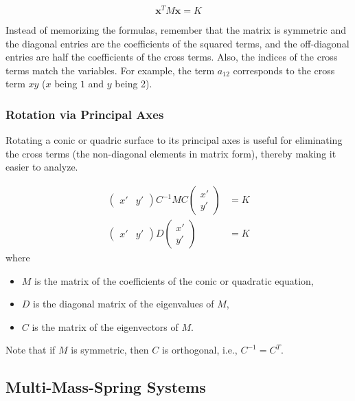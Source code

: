 \begin{equation*}
    \mathbf{x}^T M \mathbf{x} = K
\end{equation*}

Instead of memorizing the formulas, remember that the matrix is symmetric and the diagonal entries are the coefficients of the squared terms, and the off-diagonal entries are half the coefficients of the cross terms. Also, the indices of the cross terms match the variables. For example, the term $a_{12}$ corresponds to the cross term $xy$ ($x$ being $1$ and $y$ being 2).

\subsubsection{Rotation via Principal Axes}

Rotating a conic or quadric surface to its principal axes is useful for eliminating the cross terms (the non-diagonal elements in matrix form), thereby making it easier to analyze.

\begin{align*}
    \begin{pmatrix}
        x' & y'
    \end{pmatrix}
    C^{-1}MC
    \begin{pmatrix}
        x' \\ y'
    \end{pmatrix}
     & = K \\
    \begin{pmatrix}
        x' & y'
    \end{pmatrix}
    D
    \begin{pmatrix}
        x' \\ y'
    \end{pmatrix}
     & = K
\end{align*}
where
\begin{itemize}
    \item $M$ is the matrix of the coefficients of the conic or quadratic equation,
    \item $D$ is the diagonal matrix of the eigenvalues of $M$,
    \item $C$ is the matrix of the eigenvectors of $M$.
\end{itemize}
Note that if $M$ is symmetric, then $C$ is orthogonal, i.e., $C^{-1} = C^T$.

\subsection{Multi-Mass-Spring Systems}

